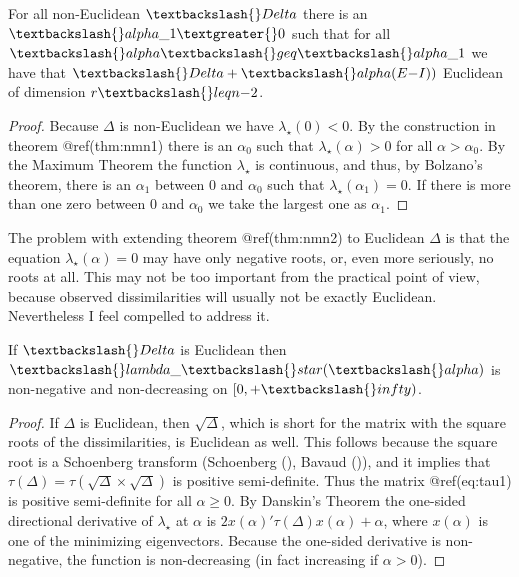 \documentclass[
  12pt,
  letterpaper,
  DIV=11,
  numbers=noendperiod]{scrreprt}
\newenvironment{Shaded}{\begin{snugshade}}{\end{snugshade}}
\newcommand{\NormalTok}[1]{\textcolor[rgb]{0.00,0.23,0.31}{#1}}
\theoremstyle{remark}
\begin{document}
\begin{Shaded}
\begin{Highlighting}[]
\NormalTok{For all non{-}Euclidean $\textbackslash{}Delta$ there is an $\textbackslash{}alpha\_1\textgreater{}0$ such that for all $\textbackslash{}alpha\textbackslash{}geq\textbackslash{}alpha\_1$ we have that $\textbackslash{}Delta+\textbackslash{}alpha(E{-}I))$ Euclidean of dimension $r\textbackslash{}leq n{-}2$.}
\end{Highlighting}
\end{Shaded}

\begin{proof}
Because \(\Delta\) is non-Euclidean we have \(\lambda_\star(0)<0\). By
the construction in theorem @ref(thm:nmn1) there is an \(\alpha_0\) such
that \(\lambda_\star(\alpha)>0\) for all \(\alpha>\alpha_0\). By the
Maximum Theorem the function \(\lambda_\star\) is continuous, and thus,
by Bolzano's theorem, there is an \(\alpha_1\) between \(0\) and
\(\alpha_0\) such that \(\lambda_\star(\alpha_1)=0\). If there is more
than one zero between \(0\) and \(\alpha_0\) we take the largest one as
\(\alpha_1\).
\end{proof}

The problem with extending theorem @ref(thm:nmn2) to Euclidean
\(\Delta\) is that the equation \(\lambda_\star(\alpha)=0\) may have
only negative roots, or, even more seriously, no roots at all. This may
not be too important from the practical point of view, because observed
dissimilarities will usually not be exactly Euclidean. Nevertheless I
feel compelled to address it.

\begin{Shaded}
\begin{Highlighting}[]
\NormalTok{If $\textbackslash{}Delta$ is Euclidean then $\textbackslash{}lambda\_\textbackslash{}star(\textbackslash{}alpha)$ is non{-}negative and non{-}decreasing on $[0,+\textbackslash{}infty)$.}
\end{Highlighting}
\end{Shaded}

\begin{proof}
If \(\Delta\) is Euclidean, then \(\sqrt{\Delta}\), which is short for
the matrix with the square roots of the dissimilarities, is Euclidean as
well. This follows because the square root is a Schoenberg transform
(Schoenberg (), Bavaud
()), and it implies that
\(\tau(\Delta)=\tau(\sqrt{\Delta}\times\sqrt{\Delta})\) is positive
semi-definite. Thus the matrix @ref(eq:tau1) is positive semi-definite
for all \(\alpha\geq 0\). By Danskin's Theorem the one-sided directional
derivative of \(\lambda_\star\) at \(\alpha\) is
\(2x(\alpha)'\tau(\Delta)x(\alpha)+\alpha\), where \(x(\alpha)\) is one
of the minimizing eigenvectors. Because the one-sided derivative is
non-negative, the function is non-decreasing (in fact increasing if
\(\alpha>0\)).
\end{proof}
\end{document}

